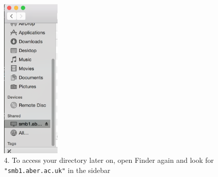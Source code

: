 \documentclass[11pt]{article}
\begin{document}
\begin{figure}[H]
    \includegraphics[width=0.25\textwidth]{images/mdrive-4.png}
    \caption*{4. To access your directory later on, open Finder again and look for \texttt{"smb1.aber.ac.uk"} in the sidebar}
\end{figure}
\end{document}
